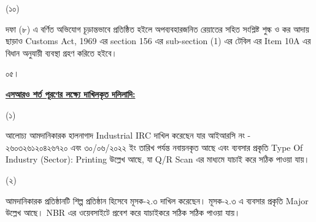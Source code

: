 \documentclass[12pt]{article}
\newcommand{\ircno}{আইআরসি নং - ২৬০৩২৬১২০৪২৬৭২০}
\newcommand{\ircrenewdt}{৩০/০৬/২০২২ ইং}
\begin{document}
\begin{minipage}[t]{0.05\linewidth}
\hspace{1em}
\end{minipage}
\begin{minipage}[t]{0.05\linewidth}
(১০)
\end{minipage}
\begin{minipage}[t]{0.9\linewidth}
দফা (৮) এ বর্ণিত অভিযোগ চূড়ান্তভাবে প্রতিষ্ঠিত হইলে
অপব্যবহারজনিত রেয়াতের সহিত সংশ্লিষ্ট শুল্ক ও কর আদায়
ছাড়াও Customs Act, 1969 এর section 156 এর
sub-section (1) এর টেবিল এর Item 10A এর বিধান
অনুযায়ী ব্যবস্থা গ্রহণ করিতে হইবে।
\\
\end{minipage}
\begin{minipage}[t]{0.05\linewidth}
০৫।
\end{minipage}
\begin{minipage}[t]{0.95\linewidth}
\underline{\textbf{এসআরও শর্ত পূরণের লক্ষ্যে
দাখিলকৃত দলিলাদি:}}
\\
\end{minipage}
\begin{minipage}[t]{0.05\linewidth}
\hspace{0em}
\end{minipage}
\begin{minipage}[t]{0.05\linewidth}
(১)
\end{minipage}
\begin{minipage}[t]{0.90\linewidth}
আলোচ্য আমদানিকারক হালনাগাদ Industrial IRC
দাখিল করেছেন যার {\ircno} এবং
{\ircrenewdt} তারিখ পর্যন্ত নবায়নকৃত আছে এবং
ব্যবসার প্রকৃতি
Type Of Industry (Sector): Printing
উল্লেখ আছে, যা Q/R Scan এর মাধ্যমে যাচাই করে
সঠিক পাওয়া যায়।
\\
\end{minipage}
\begin{minipage}[t]{0.05\linewidth}
\hspace{0em}
\end{minipage}
\begin{minipage}[t]{0.05\linewidth}
(২)
\end{minipage}
\begin{minipage}[t]{0.90\linewidth}
আমদানিকারক প্রতিষ্ঠানটি শিল্প প্রতিষ্ঠান হিসেবে
মূসক-২.৩ দাখিল করেছেন। মূসক-২.৩ এ ব্যবসার
প্রকৃতি Major
উল্লেখ আছে। NBR এর ওয়েবসাইটে প্রবেশ
করে যাচাইকরে সঠিক সঠিক পাওয়া যায়।
\\
\end{minipage}
\begin{minipage}[t]{0.05\linewidth}
\hspace{0em}
\end{minipage}
\end{document}
